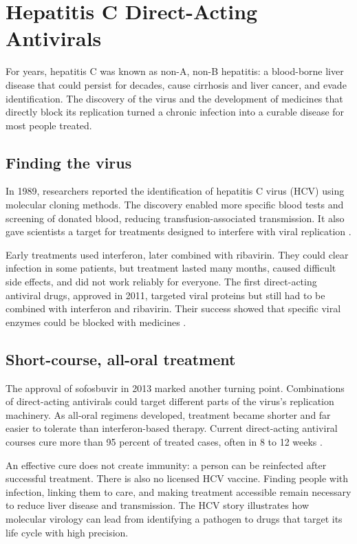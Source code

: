 \documentclass[12pt,oneside]{book}
\begin{document}
\chapter[Hepatitis C Direct-Acting Antivirals]{Hepatitis C Direct-Acting Antivirals}

For years, hepatitis C was known as non-A, non-B hepatitis: a blood-borne
liver disease that could persist for decades, cause cirrhosis and liver
cancer, and evade identification. The discovery of the virus and the
development of medicines that directly block its replication turned a
chronic infection into a curable disease for most people treated.

\section{Finding the virus}
In 1989, researchers reported the identification of hepatitis C virus (HCV)
using molecular cloning methods. The discovery enabled more specific blood
tests and screening of donated blood, reducing transfusion-associated
transmission. It also gave scientists a target for treatments designed to
interfere with viral replication \cite{niddkHCVDiscovery}.

Early treatments used interferon, later combined with ribavirin. They could
clear infection in some patients, but treatment lasted many months, caused
difficult side effects, and did not work reliably for everyone. The first
direct-acting antiviral drugs, approved in 2011, targeted viral proteins but
still had to be combined with interferon and ribavirin. Their success showed
that specific viral enzymes could be blocked with medicines
\cite{niddkHCVDiscovery}.

\section{Short-course, all-oral treatment}
The approval of sofosbuvir in 2013 marked another turning point. Combinations
of direct-acting antivirals could target different parts of the virus's
replication machinery. As all-oral regimens developed, treatment became
shorter and far easier to tolerate than interferon-based therapy. Current
direct-acting antiviral courses cure more than 95 percent of treated cases,
often in 8 to 12 weeks \cite{niddkHCVDiscovery,cdcHCVClinicalCare}.

An effective cure does not create immunity: a person can be reinfected after
successful treatment. There is also no licensed HCV vaccine. Finding people
with infection, linking them to care, and making treatment accessible remain
necessary to reduce liver disease and transmission. The HCV story illustrates
how molecular virology can lead from identifying a pathogen to drugs that
target its life cycle with high precision.
\end{document}
